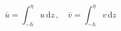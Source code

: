 \begin{equation}
    \bar{u} = \int_{-h}^{\eta} u \,\text{d}z \,,\quad \bar{v} = \int_{-h}^{\eta} v \,\text{d}z 
    \label{UVBar}
\end {equation}
